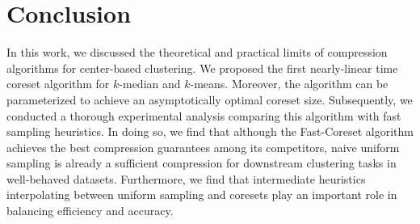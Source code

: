 \section{Conclusion}

In this work, we discussed the theoretical and practical limits of compression algorithms for center-based clustering. We proposed the first nearly-linear time
coreset algorithm for $k$-median and $k$-means. Moreover, the algorithm can be parameterized to achieve an asymptotically optimal coreset size. Subsequently, we
conducted a thorough experimental analysis comparing this algorithm with fast sampling heuristics. In doing so, we find that although the Fast-Coreset algorithm
achieves the best compression guarantees among its competitors, naive uniform sampling is already a sufficient compression for downstream clustering tasks in
well-behaved datasets. Furthermore, we find that intermediate heuristics interpolating between uniform sampling and coresets play an important role in
balancing efficiency and accuracy. 
